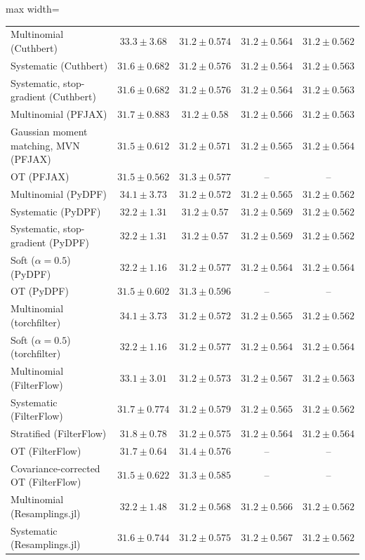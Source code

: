 \begin{table}[H]
\begin{adjustbox}{max width=\linewidth}
\begin{tabular}{lcccc}
Multinomial (Cuthbert) & $33.3\pm3.68$ & $31.2\pm0.574$ & $\mathbf{31.2\pm0.564}$ & $31.2\pm0.562$ \\
Systematic (Cuthbert) & $31.6\pm0.682$ & $31.2\pm0.576$ & $31.2\pm0.564$ & $31.2\pm0.563$ \\
Systematic, stop-gradient (Cuthbert) & $31.6\pm0.682$ & $31.2\pm0.576$ & $31.2\pm0.564$ & $31.2\pm0.563$ \\
Multinomial (PFJAX) & $31.7\pm0.883$ & $31.2\pm0.58$ & $31.2\pm0.566$ & $31.2\pm0.563$ \\
Gaussian moment matching, MVN (PFJAX) & $\mathbf{31.5\pm0.612}$ & $31.2\pm0.571$ & $31.2\pm0.565$ & $31.2\pm0.564$ \\
OT (PFJAX) & $31.5\pm0.562$ & $31.3\pm0.577$ & -- & -- \\
Multinomial (PyDPF) & $34.1\pm3.73$ & $31.2\pm0.572$ & $31.2\pm0.565$ & $31.2\pm0.562$ \\
Systematic (PyDPF) & $32.2\pm1.31$ & $31.2\pm0.57$ & $31.2\pm0.569$ & $31.2\pm0.562$ \\
Systematic, stop-gradient (PyDPF) & $32.2\pm1.31$ & $31.2\pm0.57$ & $31.2\pm0.569$ & $31.2\pm0.562$ \\
Soft ($\alpha{=}0.5$) (PyDPF) & $32.2\pm1.16$ & $31.2\pm0.577$ & $31.2\pm0.564$ & $31.2\pm0.564$ \\
OT (PyDPF) & $31.5\pm0.602$ & $31.3\pm0.596$ & -- & -- \\
Multinomial (torchfilter) & $34.1\pm3.73$ & $31.2\pm0.572$ & $31.2\pm0.565$ & $31.2\pm0.562$ \\
Soft ($\alpha{=}0.5$) (torchfilter) & $32.2\pm1.16$ & $31.2\pm0.577$ & $31.2\pm0.564$ & $31.2\pm0.564$ \\
Multinomial (FilterFlow) & $33.1\pm3.01$ & $31.2\pm0.573$ & $31.2\pm0.567$ & $31.2\pm0.563$ \\
Systematic (FilterFlow) & $31.7\pm0.774$ & $31.2\pm0.579$ & $31.2\pm0.565$ & $31.2\pm0.562$ \\
Stratified (FilterFlow) & $31.8\pm0.78$ & $31.2\pm0.575$ & $31.2\pm0.564$ & $31.2\pm0.564$ \\
OT (FilterFlow) & $31.7\pm0.64$ & $31.4\pm0.576$ & -- & -- \\
Covariance-corrected OT (FilterFlow) & $31.5\pm0.622$ & $31.3\pm0.585$ & -- & -- \\
Multinomial (Resamplings.jl) & $32.2\pm1.48$ & $31.2\pm0.568$ & $31.2\pm0.566$ & $31.2\pm0.562$ \\
Systematic (Resamplings.jl) & $31.6\pm0.744$ & $31.2\pm0.575$ & $31.2\pm0.567$ & $31.2\pm0.562$ \\

\end{tabular}
\end{adjustbox}
\end{table}
